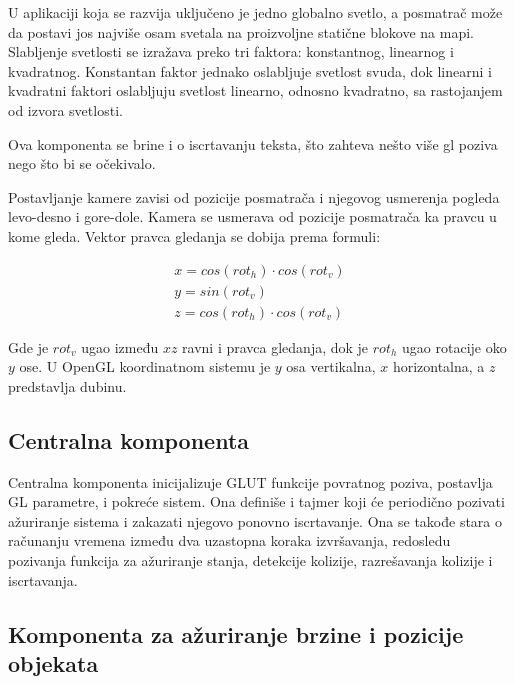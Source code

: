 \documentclass[12pt,oneside]{memoir}
\begin{document}
U aplikaciji koja se razvija uključeno je jedno globalno svetlo, a posmatrač može da postavi jos najviše osam svetala na 
proizvoljne statične blokove na mapi. 
Slabljenje svetlosti se izražava preko tri faktora: konstantnog, linearnog i kvadratnog.
Konstantan faktor jednako oslabljuje svetlost svuda, dok linearni i kvadratni faktori oslabljuju svetlost
linearno, odnosno kvadratno, sa rastojanjem od izvora svetlosti.

Ova komponenta se brine i o iscrtavanju teksta, što zahteva nešto više gl poziva nego što bi se očekivalo.

Postavljanje kamere zavisi od pozicije posmatrača i njegovog usmerenja pogleda levo-desno i gore-dole.
Kamera se usmerava od pozicije posmatrača ka pravcu u kome gleda.
Vektor pravca gledanja se dobija prema formuli:

\begin{equation}
\label{eq:camera}
\begin{split}
x = cos(rot_h) \cdot cos(rot_v) \\
y = sin(rot_v) \\
z = cos(rot_h) \cdot  cos(rot_v)	
\end{split}
\end{equation}


\noindent Gde je $rot_v$ ugao između $xz$ ravni i pravca gledanja, dok je $rot_h$ ugao rotacije oko $y$ ose.
U OpenGL koordinatnom sistemu je $y$ osa vertikalna, $x$ horizontalna, a $z$ predstavlja dubinu.

\subsection{Centralna komponenta}

Centralna komponenta inicijalizuje GLUT funkcije povratnog poziva, postavlja GL parametre, i pokreće sistem.
Ona definiše i tajmer koji će periodično pozivati ažuriranje sistema i zakazati njegovo ponovno iscrtavanje. 
Ona se takođe stara o računanju vremena između dva uzastopna koraka izvršavanja, redosledu pozivanja funkcija za ažuriranje stanja,
detekcije kolizije, razrešavanja kolizije i iscrtavanja.

\subsection{Komponenta za ažuriranje brzine i pozicije objekata}
\end{document}
